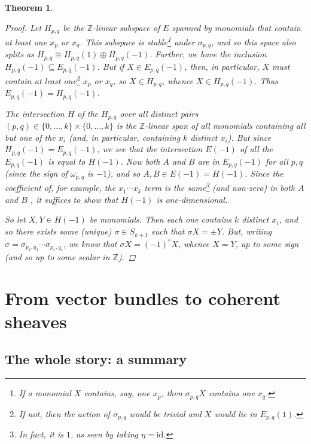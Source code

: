 \documentclass[11pt,fleqn]{article}
\theoremstyle{plain}
\newtheorem{theorem}{Theorem}[subsection]
\theoremstyle{definition}
\theoremstyle{remark}
\numberwithin{equation}{theorem}
\newcommand{\id}{\mathrm{id}}
\begin{document}
\begin{theorem}
\begin{proof}
                Let $H_{p,q}$ be the $\mathbb{Z}$-linear subspace of $E$ spanned by monomials that contain at least one $x_p$ or $x_q$.
                This subspace is stable\footnote{If a monomial $X$ contains, say, one $x_p$, then $\sigma_{p,q}X$ contains one $x_q$.} under $\sigma_{p,q}$, and so this space also splits as $H_{p,q}\cong H_{p,q}(1)\oplus H_{p,q}(-1)$.
                Further, we have the inclusion $H_{p,q}(-1)\subseteq E_{p,q}(-1)$.
                But if $X\in E_{p,q}(-1)$, then, in particular, $X$ must contain at least one\footnote{If not, then the action of $\sigma_{p,q}$ would be trivial and $X$ would lie in $E_{p,q}(1)$.} $x_p$ or $x_q$, so $X\in H_{p,q}$, whence $X\in H_{p,q}(-1)$.
                Thus $E_{p,q}(-1)=H_{p,q}(-1)$.

                The intersection $H$ of the $H_{p,q}$ over all \emph{distinct} pairs $(p,q)\in\{0,\ldots,k\}\times\{0,\ldots,k\}$ is the $\mathbb{Z}$-linear span of all monomials containing all but one of the $x_i$ (and, in particular, containing $k$ distinct $x_i$).
                But since $H_{p,q}(-1)=E_{p,q}(-1)$, we see that the intersection $E(-1)$ of all the $E_{p,q}(-1)$ is equal to $H(-1)$.
                Now both $A$ and $B$ are in $E_{p,q}(-1)$ for all $p,q$ (since the sign of $\omega_{p,q}$ is $-1$), and so $A,B\in E(-1)=H(-1)$.
                Since the coefficient of, for example, the $x_1\cdots x_k$ term is the same\footnote{In fact, it is $1$, as seen by taking $\eta=\id$.} (and \emph{non-zero}) in both $A$ and $B$ , it suffices to show that $H(-1)$ is one-dimensional.

                So let $X,Y\in H(-1)$ be monomials.
                Then each one contains $k$ distinct $x_i$, and so there exists some (unique) $\sigma\in S_{k+1}$ such that $\sigma X=\pm Y$.
                But, writing $\sigma=\sigma_{p_1,q_1}\cdots\sigma_{p_r,q_r}$, we know that $\sigma X=(-1)^r X$, whence $X=Y$, up to some sign (and so up to some scalar in $\mathbb{Z}$).
            \end{proof}
        \end{theorem}



\section{From vector bundles to coherent sheaves}\label{section:from-vector-bundles-to-coherent-sheaves}

    \subsection{The whole story: a summary}
\end{document}
